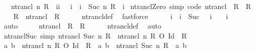 \begin{isabellebody}
\ \ \ {\isachardoublequoteopen}ntrancl\ n\ R\ {\isacharequal}{\kern0pt}\ {\isacharparenleft}{\kern0pt}{\isasymUnion}i{\isasymin}{\isacharbraceleft}{\kern0pt}i{\isachardot}{\kern0pt}\ {}\ {\isacharless}{\kern0pt}\ i\ {\isasymand}\ i\ {\isasymle}\ Suc\ n{\isacharbraceright}{\kern0pt}{\isachardot}{\kern0pt}\ R\ {\isacharcircum}{\kern0pt}{\isacharcircum}{\kern0pt}\ i{\isacharparenright}{\kern0pt}{\isachardoublequoteclose}\isanewline
\isanewline
{}\isamarkupfalse%
\ ntrancl{\isacharunderscore}{\kern0pt}Zero\ {\isacharbrackleft}{\kern0pt}simp{\isacharcomma}{\kern0pt}\ code{\isacharbrackright}{\kern0pt}{\isacharcolon}{\kern0pt}\ {\isachardoublequoteopen}ntrancl\ {}\ R\ {\isacharequal}{\kern0pt}\ R{\isachardoublequoteclose}\isanewline
%
\isadelimproof
%
\endisadelimproof
%
\isatagproof
{}\isamarkupfalse%
\isanewline
\ \ \isamarkupfalse%
\ {\isachardoublequoteopen}R\ {\isasymsubseteq}\ ntrancl\ {}\ R{\isachardoublequoteclose}\isanewline
\ \ \ \ \isamarkupfalse%
\ ntrancl{\isacharunderscore}{\kern0pt}def\ \isamarkupfalse%
\ fastforce\isanewline
\ \ \isamarkupfalse%
\ {\isachardoublequoteopen}{}\ {\isacharless}{\kern0pt}\ i\ {\isasymand}\ i\ {\isasymle}\ Suc\ {}\ {\isasymlongleftrightarrow}\ i\ {\isacharequal}{\kern0pt}\ {}{\isachardoublequoteclose}\ \ i\isanewline
\ \ \ \ \isamarkupfalse%
\ auto\isanewline
\ \ \isamarkupfalse%
\ \isamarkupfalse%
\ {\isachardoublequoteopen}ntrancl\ {}\ R\ {\isasymle}\ R{\isachardoublequoteclose}\isanewline
\ \ \ \ \isamarkupfalse%
\ ntrancl{\isacharunderscore}{\kern0pt}def\ \isamarkupfalse%
\ auto\isanewline
{}\isamarkupfalse%
%
\endisatagproof
{\isafoldproof}%
%
\isadelimproof
\isanewline
%
\endisadelimproof
\isanewline
{}\isamarkupfalse%
\ ntrancl{\isacharunderscore}{\kern0pt}Suc\ {\isacharbrackleft}{\kern0pt}simp{\isacharbrackright}{\kern0pt}{\isacharcolon}{\kern0pt}\ {\isachardoublequoteopen}ntrancl\ {\isacharparenleft}{\kern0pt}Suc\ n{\isacharparenright}{\kern0pt}\ R\ {\isacharequal}{\kern0pt}\ ntrancl\ n\ R\ O\ {\isacharparenleft}{\kern0pt}Id\ {\isasymunion}\ R{\isacharparenright}{\kern0pt}{\isachardoublequoteclose}\isanewline
%
\isadelimproof
%
\endisadelimproof
%
\isatagproof
{}\isamarkupfalse%
\isanewline
\ \ \isamarkupfalse%
\ {\isachardoublequoteopen}{\isacharparenleft}{\kern0pt}a{\isacharcomma}{\kern0pt}\ b{\isacharparenright}{\kern0pt}\ {\isasymin}\ ntrancl\ n\ R\ O\ {\isacharparenleft}{\kern0pt}Id\ {\isasymunion}\ R{\isacharparenright}{\kern0pt}{\isachardoublequoteclose}\ \ {\isachardoublequoteopen}{\isacharparenleft}{\kern0pt}a{\isacharcomma}{\kern0pt}\ b{\isacharparenright}{\kern0pt}\ {\isasymin}\ ntrancl\ {\isacharparenleft}{\kern0pt}Suc\ n{\isacharparenright}{\kern0pt}\ R{\isachardoublequoteclose}\ \ a\ b\isanewline

\end{isabellebody}
